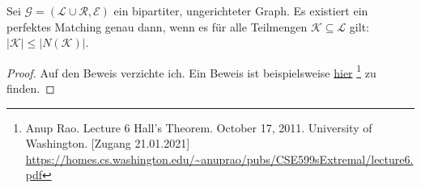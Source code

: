\begin{satz}
Sei $\mathcal{G} = (\mathcal{L} \cup \mathcal{R}, \mathcal{E})$ ein bipartiter, ungerichteter Graph.
Es existiert ein perfektes Matching genau dann,
wenn es für alle Teilmengen $\mathcal{K} \subseteq \mathcal{L}$ gilt: $|\mathcal{K}| \leqslant |N(\mathcal{K})|$.\textnormal{\cite[S.~736, Übung]{cormen:matchings}}
\end{satz}

\begin{proof}
Auf den Beweis verzichte ich. Ein Beweis ist beispielsweise
\href{https://homes.cs.washington.edu/~anuprao/pubs/CSE599sExtremal/lecture6.pdf}{hier}
\footnote{Anup Rao. Lecture 6 Hall’s Theorem. October 17, 2011. University of Washington. [Zugang 21.01.2021]\\
\url{https://homes.cs.washington.edu/~anuprao/pubs/CSE599sExtremal/lecture6.pdf}} zu finden.
\end{proof}
